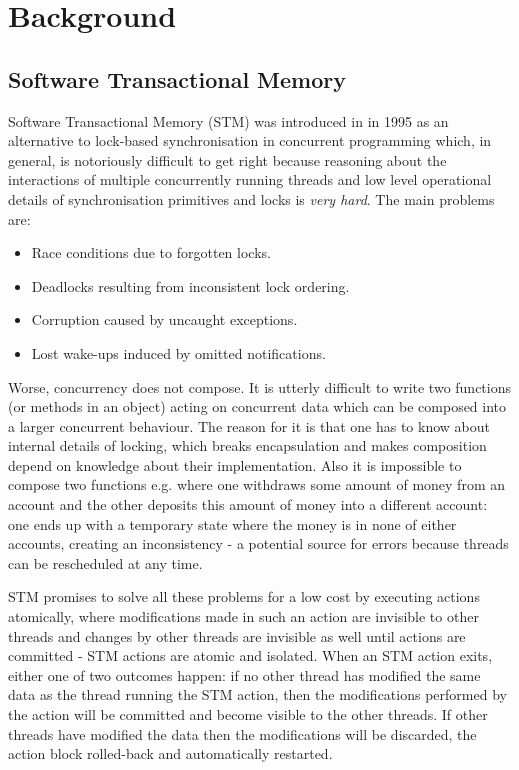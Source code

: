 \section{Background}
\label{sec:background}

\subsection{Software Transactional Memory}
Software Transactional Memory (STM) was introduced in \cite{shavit_software_1995} in 1995 as an alternative to lock-based synchronisation in concurrent programming which, in general, is notoriously difficult to get right because reasoning about the interactions of multiple concurrently running threads and low level operational details of synchronisation primitives and locks is \textit{very hard}. The main problems are:

\begin{itemize}
	\item Race conditions due to forgotten locks.
	\item Deadlocks resulting from inconsistent lock ordering.
	\item Corruption caused by uncaught exceptions.
	\item Lost wake-ups induced by omitted notifications.
\end{itemize}

Worse, concurrency does not compose. It is utterly difficult to write two functions (or methods in an object) acting on concurrent data which can be composed into a larger concurrent behaviour. The reason for it is that one has to know about internal details of locking, which breaks encapsulation and makes composition depend on knowledge about their implementation. Also it is impossible to compose two functions e.g. where one withdraws some amount of money from an account and the other deposits this amount of money into a different account: one ends up with a temporary state where the money is in none of either accounts, creating an inconsistency - a potential source for errors because threads can be rescheduled at any time.

STM promises to solve all these problems for a low cost by executing actions atomically, where modifications made in such an action are invisible to other threads and changes by other threads are invisible as well until actions are committed - STM actions are atomic and isolated. When an STM action exits, either one of two outcomes happen: if no other thread has modified the same data as the thread running the STM action, then the modifications performed by the action will be committed and become visible to the other threads. If other threads have modified the data then the modifications will be discarded, the action block rolled-back and automatically restarted.

